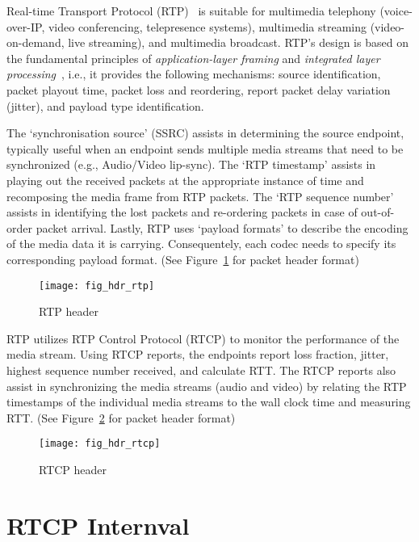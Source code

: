 
Real-time Transport Protocol (RTP)~\cite{rfc3550} is suitable for multimedia
telephony (voice-over-IP, video conferencing, telepresence systems),
multimedia streaming (video-on-demand, live streaming), and multimedia
broadcast. RTP's design is based on the fundamental principles of \textit
{application-layer framing} and \textit{integrated layer
processing}~\cite{clark:alf}, i.e., it provides the following mechanisms:
source identification, packet playout time, packet loss and reordering, report
packet delay variation (jitter), and payload type identification.

The `synchronisation source' (SSRC) assists in determining the source
endpoint, typically useful when an endpoint sends multiple media streams that
need to be synchronized (e.g., Audio/Video lip-sync). The `RTP timestamp'
assists in playing out the received packets at the appropriate instance of
time and recomposing the media frame from RTP packets. The `RTP sequence
number' assists in identifying the lost packets and re-ordering packets in
case of out-of-order packet arrival. Lastly, RTP uses `payload formats' to
describe the encoding of the media data it is carrying. Consequentely, each
codec needs to specify its corresponding payload format. (See
Figure~\ref{fig:3:rtp.hdr} for packet header format)

\begin{figure}[!htbp]
\centerline{\texttt{[image: fig\_hdr\_rtp]}}
\caption{RTP header}
\label{fig:3:rtp.hdr}
\end{figure}

RTP utilizes RTP Control Protocol (RTCP) to monitor the performance of the
media stream. Using RTCP reports, the endpoints report loss fraction, jitter,
highest sequence number received, and calculate RTT. The RTCP reports also
assist in synchronizing the media streams (audio and video) by relating the
RTP timestamps of the individual media streams to the wall clock time and
measuring RTT. (See Figure~\ref{fig:3:rtcp.hdr} for packet header format)

\begin{figure}
\centerline{\texttt{[image: fig\_hdr\_rtcp]}}
\caption{RTCP header}
\label{fig:3:rtcp.hdr}
\end{figure}

\section{RTCP Internval}

